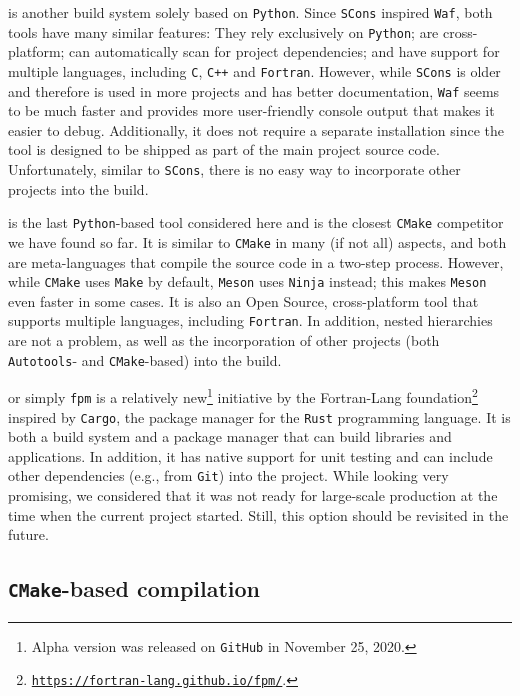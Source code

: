 \documentclass[twocolumn]{openjournal}
\begin{document}
 is another build system solely based on
\texttt{Python}. Since \texttt{SCons} inspired \texttt{Waf}, both tools have
many similar features: They rely exclusively on \texttt{Python}; are
cross-platform; can automatically scan for project dependencies; and have
support for multiple languages, including \texttt{C}, \texttt{C++} and
\texttt{Fortran}. However, while \texttt{SCons} is older and therefore is used
in more projects and has better documentation, \texttt{Waf} seems to be much
faster and provides more user-friendly console output that makes it easier to
debug. Additionally, it does not require a separate installation since the tool
is designed to be shipped as part of the main project source code.
Unfortunately, similar to \texttt{SCons}, there is no easy way to incorporate
other projects into the build.

 is the last \texttt{Python}-based tool considered
here and is the closest \texttt{CMake} competitor we have found so far. It is
similar to \texttt{CMake} in many (if not all) aspects, and both are
meta-languages that compile the source code in a two-step process. However,
while \texttt{CMake} uses \texttt{Make} by default, \texttt{Meson} uses
\texttt{Ninja} instead; this makes \texttt{Meson} even faster in some cases. It
is also an Open Source, cross-platform tool that supports multiple languages,
including \texttt{Fortran}. In addition, nested hierarchies are not a problem,
as well as the incorporation of other projects (both \texttt{Autotools}- and
\texttt{CMake}-based) into the build.

 or simply \texttt{fpm} is a relatively
new\footnote{ Alpha version was released on \texttt{GitHub} in November 25,
2020.} initiative by the Fortran-Lang
foundation\footnote{\href{https://fortran-lang.github.io/fpm/}{\texttt{https://fortran-lang.github.io/fpm/}}.}
inspired by \texttt{Cargo}, the package manager for the \texttt{Rust}
programming language. It is both a build system and a package manager that can
build libraries and applications. In addition, it has native support for unit
testing and can include other dependencies (e.g., from \texttt{Git}) into the
project. While looking very promising, we considered that it was not ready for
large-scale production at the time when the current project started. Still,
this option should be revisited in the future.


\subsection{\texttt{CMake}-based compilation}
\label{sec:cmake}
\end{document}

